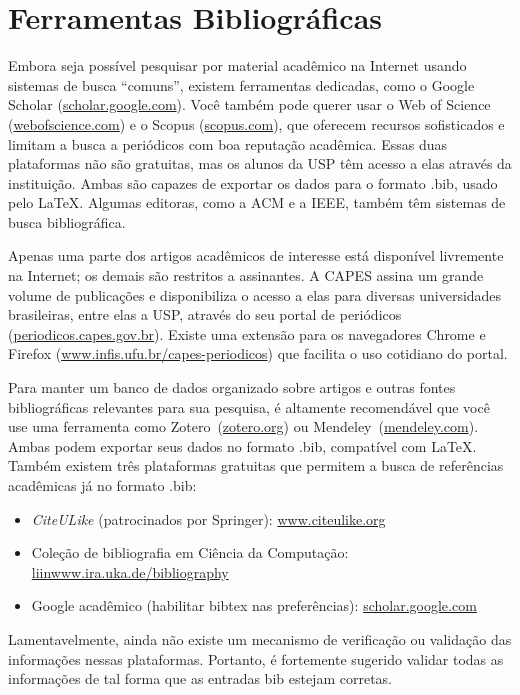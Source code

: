 \section{Ferramentas Bibliográficas}

Embora seja possível pesquisar por material acadêmico na Internet usando sistemas
de busca ``comuns'', existem ferramentas dedicadas, como o \textsf{Google Scholar}
(\url{scholar.google.com}). Você também pode querer usar o \textsf{Web of Science}
(\url{webofscience.com}) e o \textsf{Scopus} (\url{scopus.com}), que oferecem
recursos sofisticados e limitam a busca a periódicos com boa reputação acadêmica.
Essas duas plataformas não são gratuitas, mas os alunos da USP têm acesso a elas
através da instituição. Ambas são capazes de exportar os dados para o formato .bib,
usado pelo \LaTeX{}. Algumas editoras, como a ACM e a IEEE, também têm sistemas de
busca bibliográfica.

Apenas uma parte dos artigos acadêmicos de interesse está disponível livremente
na Internet; os demais são restritos a assinantes. A CAPES assina um grande
volume de publicações e disponibiliza o acesso a elas para diversas universidades
brasileiras, entre elas a USP, através do seu portal de periódicos
(\url{periodicos.capes.gov.br}). Existe uma extensão para os navegadores
Chrome e Firefox (\url{www.infis.ufu.br/capes-periodicos}) que facilita o uso
cotidiano do portal.

Para manter um banco de dados organizado sobre artigos e outras fontes bibliográficas
relevantes para sua pesquisa, é altamente recomendável que você use uma ferramenta
como Zotero~(\url{zotero.org}) ou
Mendeley~(\url{mendeley.com}). Ambas podem exportar seus dados no
formato .bib, compatível com \LaTeX{}. Também existem três plataformas
gratuitas que permitem a busca de referências acadêmicas já no formato .bib:

\begin{itemize}
  \item \emph{CiteULike} (patrocinados por Springer): \url{www.citeulike.org}
  \item Coleção de bibliografia em Ciência da Computação: \url{liinwww.ira.uka.de/bibliography}
  \item Google acadêmico (habilitar bibtex nas preferências): \url{scholar.google.com}
\end{itemize}

Lamentavelmente, ainda não existe um mecanismo de verificação ou validação das
informações nessas plataformas. Portanto, é fortemente sugerido validar todas
as informações de tal forma que as entradas bib estejam corretas.

